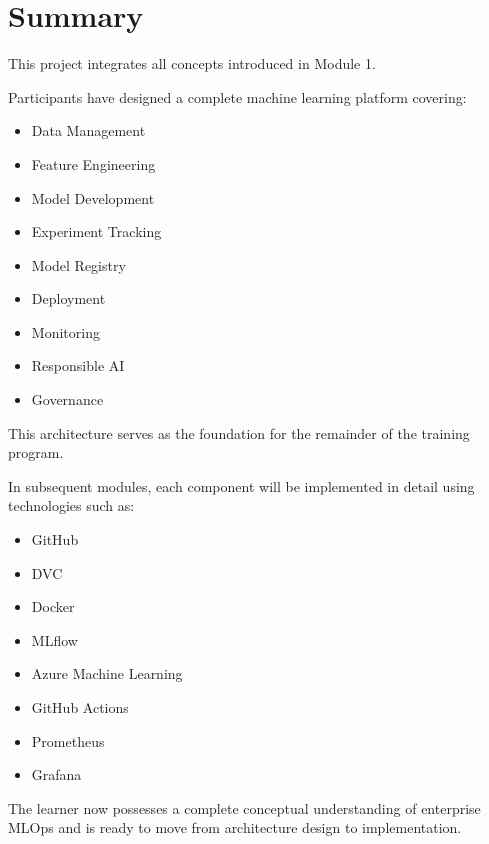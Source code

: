 \section{Summary}

This project integrates all concepts introduced in Module 1.

Participants have designed a complete machine learning platform covering:

\begin{itemize}
    \item Data Management
    \item Feature Engineering
    \item Model Development
    \item Experiment Tracking
    \item Model Registry
    \item Deployment
    \item Monitoring
    \item Responsible AI
    \item Governance
\end{itemize}

This architecture serves as the foundation for the remainder of the training program.

In subsequent modules, each component will be implemented in detail using technologies such as:

\begin{itemize}
    \item GitHub
    \item DVC
    \item Docker
    \item MLflow
    \item Azure Machine Learning
    \item GitHub Actions
    \item Prometheus
    \item Grafana
\end{itemize}

The learner now possesses a complete conceptual understanding of enterprise MLOps and is ready to move from architecture design to implementation.

